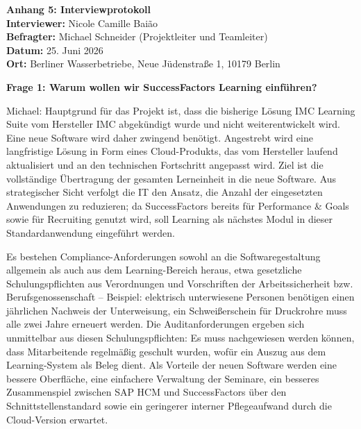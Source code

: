 \documentclass[
    12pt, 
    a4paper,
    ]{scrartcl} %
\begin{document}
\newpage
{}
{}
\label{sec:Anhang5}

{\Large\bfseries Anhang 5: Interviewprotokoll}\\[1em]
\textbf{Interviewer:} Nicole Camille Baião \\
\textbf{Befragter:} Michael Schneider (Projektleiter und Teamleiter) \\
\textbf{Datum:} 25. Juni 2026 \\
\textbf{Ort:} Berliner Wasserbetriebe, Neue J\"udenstra{\ss}e 1, 10179 Berlin

\bigskip
{}

\bigskip
{}

\textbf{Frage 1: Warum wollen wir SuccessFactors Learning einf\"uhren?}

Michael: Hauptgrund f\"ur das Projekt ist, dass die bisherige L\"osung IMC Learning Suite vom Hersteller IMC abgek\"undigt wurde und nicht weiterentwickelt wird. Eine neue Software wird daher zwingend ben\"otigt. Angestrebt wird eine langfristige L\"osung in Form eines Cloud-Produkts, das vom Hersteller laufend aktualisiert und an den technischen Fortschritt angepasst wird. Ziel ist die vollst\"andige \"Ubertragung der gesamten Lerneinheit in die neue Software. Aus strategischer Sicht verfolgt die IT den Ansatz, die Anzahl der eingesetzten Anwendungen zu reduzieren; da SuccessFactors bereits f\"ur Performance \& Goals sowie f\"ur Recruiting genutzt wird, soll Learning als n\"achstes Modul in dieser Standardanwendung eingef\"uhrt werden. 

Es bestehen Compliance-Anforderungen sowohl an die Softwaregestaltung allgemein als auch aus dem Learning-Bereich heraus, etwa gesetzliche Schulungspflichten aus Verordnungen und Vorschriften der Arbeitssicherheit bzw. Berufsgenossenschaft -- Beispiel: elektrisch unterwiesene Personen ben\"otigen einen j\"ahrlichen Nachweis der Unterweisung, ein Schwei{\ss}erschein f\"ur Druckrohre muss alle zwei Jahre erneuert werden. Die Auditanforderungen ergeben sich unmittelbar aus diesen Schulungspflichten: Es muss nachgewiesen werden k\"onnen, dass Mitarbeitende regelm\"a{\ss}ig geschult wurden, wof\"ur ein Auszug aus dem Learning-System als Beleg dient. Als Vorteile der neuen Software werden eine bessere Oberfl\"ache, eine einfachere Verwaltung der Seminare, ein besseres Zusammenspiel zwischen SAP HCM und SuccessFactors \"uber den Schnittstellenstandard sowie ein geringerer interner Pflegeaufwand durch die Cloud-Version erwartet.
\end{document}
